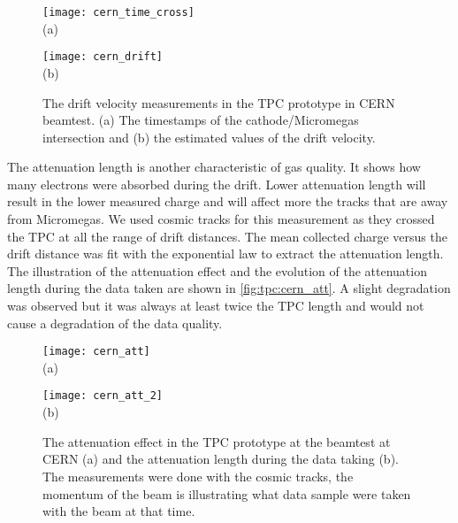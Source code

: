 \documentclass[../main.tex]{subfiles}
\begin{document}
\begin{figure}[!ht]
  \centering
  \begin{minipage}{0.49\linewidth}
    \centering
    \texttt{[image: cern\_time\_cross]} \\ (a)
  \end{minipage}
  \begin{minipage}{0.49\linewidth}
    \centering
    \texttt{[image: cern\_drift]} \\ (b)
  \end{minipage}
  \caption{The drift velocity measurements in the TPC prototype in CERN beamtest. (a) The timestamps of the cathode/Micromegas intersection and (b) the estimated values  of the drift velocity.}
  \label{fig:tpc:cern_drift}
\end{figure}

The attenuation length is another characteristic of gas quality. It shows how many electrons were absorbed during the drift. Lower attenuation length will result in the lower measured charge and will affect more the tracks that are away from Micromegas. We used cosmic tracks for this measurement as they crossed the TPC at all the range of drift distances. The mean collected charge versus the drift distance was fit with the exponential law to extract the attenuation length. The illustration of the attenuation effect and the evolution of the attenuation length during the data taken are shown in \autoref{fig:tpc:cern_att}. A slight degradation was observed but it was always at least twice the TPC length and would not cause a degradation of the data quality.

\begin{figure}[!ht]
  \centering
  \begin{minipage}{0.49\linewidth}
    \centering
    \texttt{[image: cern\_att]} \\ (a)
  \end{minipage}
  \begin{minipage}{0.49\linewidth}
    \centering
    \texttt{[image: cern\_att\_2]} \\ (b)
  \end{minipage}
  \caption{The attenuation effect in the TPC prototype at the beamtest at CERN (a) and the attenuation length during the data taking (b). The measurements were done with the cosmic tracks, the momentum of the beam is illustrating what data sample were taken with the beam at that time.}
  \label{fig:tpc:cern_att}
\end{figure}
\end{document}
